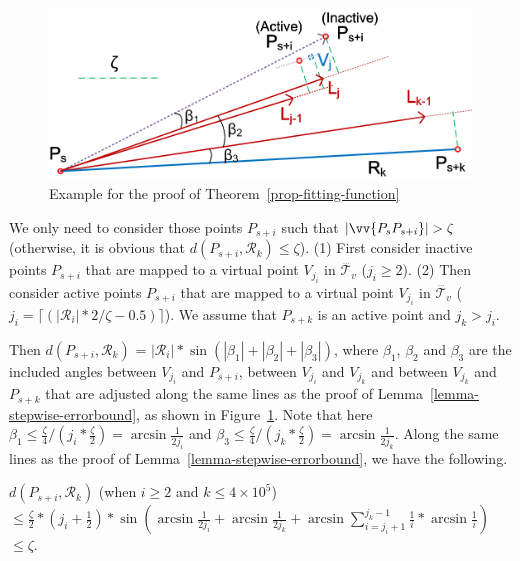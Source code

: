 {\begin{figure}[tbh!]
\centering
\includegraphics[scale = 0.72]{figures/Fig-AnyTraj.png}
\vspace{-0ex}
\caption{Example for the proof of Theorem~\ref{prop-fitting-function}}
\label{fig:appendix-anytraj}
\vspace{-2ex}
\end{figure}


 We only need to consider those points $P_{s+i}$ such that $|\vv{P_sP_{s+i}}|>\zeta$ (otherwise, it is obvious that $d(P_{s+i}, \mathcal{R}_{k})\le \zeta$).
(1) First consider inactive points  $P_{s+i}$ that are mapped to a virtual point $V_{j_i}$ in $\dddot{\mathcal{T}_v}$ ($j_i\ge 2$).
(2) Then consider active points  $P_{s+i}$ that are mapped to a virtual point $V_{j_i}$ in $\dddot{\mathcal{T}_v}$ ($j_i= \lceil(|\mathcal{R}_{i}|*2/\zeta - 0.5)\rceil$).
We assume that $P_{s+k}$ is an active point and $j_k>j_i$.

Then $d(P_{s+i}, \mathcal{R}_{k})$ = $|\mathcal{R}_{i}|*\sin(|\beta_1|+|\beta_2|+|\beta_3|)$, where $\beta_1$, $\beta_2$ and $\beta_3$ are the included angles between
$V_{j_i}$ and $P_{s+i}$, between $V_{j_i}$ and $V_{j_k}$ and between $V_{j_k}$ and $P_{s+k}$ that are adjusted along the same lines as the proof of Lemma~\ref{lemma-stepwise-errorbound}, as shown in Figure~\ref{fig:appendix-anytraj}.
%
Note that here $\beta_1\le \frac{\zeta}{4}/(j_i*\frac{\zeta}{2}) = \arcsin\frac{1}{2j_i}$ and $\beta_3\le \frac{\zeta}{4}/(j_k*\frac{\zeta}{2}) = \arcsin\frac{1}{2j_k}$.
Along the same lines as the proof of Lemma~\ref{lemma-stepwise-errorbound}, we have the following.

$d(P_{s+i}, \mathcal{R}_{k})$ (when $i\ge 2$ and $k\le 4\times 10^5$)\\
$\le \frac{\zeta}{2}*(j_i+\frac{1}{2})*\sin(\arcsin\frac{1}{2j_i}+\arcsin\frac{1}{2j_k}+\arcsin\sum_{i=j_i+1}^{j_k-1} \frac{1}{i}*\arcsin\frac{1}{i})$
$\le\zeta$.
\eop









}
